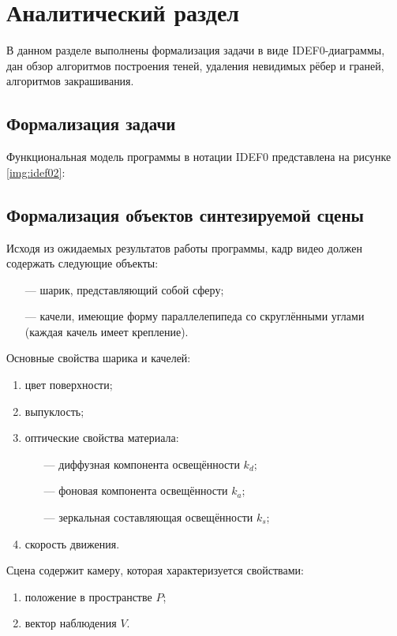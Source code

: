 \chapter{Аналитический раздел}
\fontsize{16}{19}\selectfont

В данном разделе выполнены формализация задачи в виде IDEF0-диаграммы, дан обзор алгоритмов построения теней, удаления невидимых рёбер и граней, алгоритмов закрашивания.

\section{Формализация задачи}

Функциональная модель программы в нотации IDEF0 представлена на рисунке \ref{img:idef02}:


\section{Формализация объектов синтезируемой сцены}
\label{sec:formalize}

Исходя из ожидаемых результатов работы программы, кадр видео должен содержать следующие объекты:
\begin{itemize}
	\item[---] шарик, представляющий собой сферу;
	\item[---] качели, имеющие форму параллелепипеда со скруглёнными углами (каждая качель имеет крепление).
\end{itemize}

Основные свойства шарика и качелей:
\begin{enumerate}
	\item цвет поверхности;
	\item выпуклость;
	\item оптические свойства материала:
		\begin{itemize}
			\item[---] диффузная компонента освещённости $k_d$;
			\item[---] фоновая компонента освещённости $k_a$;
			\item[---] зеркальная составляющая освещённости $k_s$;
		\end{itemize}
	\item скорость движения.
\end{enumerate}

Сцена содержит камеру, которая характеризуется свойствами:
\begin{enumerate}
	\item положение в пространстве $P$;
	\item вектор наблюдения $V$.
\end{enumerate}

